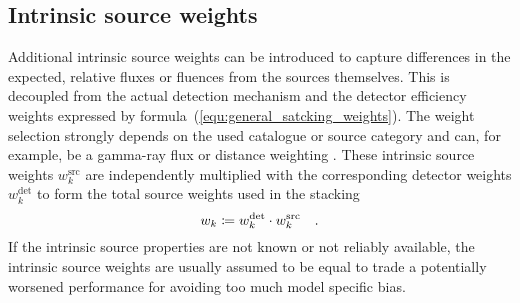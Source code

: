 \subsection{Intrinsic source weights}
Additional intrinsic source weights can be introduced to capture differences in the expected, relative fluxes or fluences from the sources themselves.
This is decoupled from the actual detection mechanism and the detector efficiency weights expressed by formula~(\ref{equ:general_satcking_weights}).
The weight selection strongly depends on the used catalogue or source category and can, for example, be a gamma-ray flux or distance weighting \cite{Huber:2017wxt,Aartsen:2016lir}.
These intrinsic source weights $w_k^\text{src}$ are independently multiplied with the corresponding detector weights $w_k^\text{det}$ to form the total source weights used in the stacking
\begin{equation}
  w_k \coloneqq w_k^\text{det} \cdot w_k^\text{src}
  \quad\text{.}
\end{equation}
If the intrinsic source properties are not known or not reliably available, the intrinsic source weights are usually assumed to be equal to trade a potentially worsened performance for avoiding too much model specific bias.

